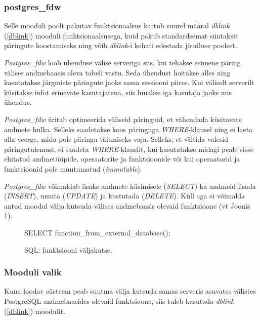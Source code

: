 \documentclass[a4paper,12pt]{article} %
\begin{document}
\subsubsection{postgres\_fdw}
Selle mooduli poolt pakutav funktsionaalsus kattub suurel määral \textit{dblink} (\ref{dblink}) mooduli funktsionaalsusega, kuid pakub standardsemat süntaksit päringute koostamiseks ning võib \textit{dblink}-i kohati edestada jõudluse poolest.\par
\textit{Postgres\_fdw} loob ühenduse välise serveriga siis, kui tehakse esimene päring välises andmebaasis oleva tabeli vastu. Seda ühendust hoitakse alles ning kasutatakse järgmiste päringute jaoks sama sessiooni piires. Kui väliselt serverilt küsitakse infot erinevate kasutajatena, siis luuakse iga kasutaja jaoks uus ühendus.\par
\textit{Postgres\_fdw} üritab optimeerida väliseid päringuid, et vähendada küsitavate andmete hulka. Selleks saadetakse koos päringuga \textit{WHERE}-klausel ning ei laeta alla veerge, mida pole päringu täitmiseks vaja. Selleks, et vältida valesid päringutulemusi, ei saadeta \textit{WHERE}-klauslit, kui kasutatakse midagi peale sisse ehitatud andmetüüpide, operaatorite ja funktsioonide või kui operaatorid ja funktsioonid pole muutumatud (\textit{immutable}). \cite{PostgreSQLfdw}\par
\textit{Postgres\_fdw} võimaldab lisaks andmete küsimisele (\textit{SELECT}) ka andmeid lisada (\textit{INSERT}), muuta (\textit{UPDATE}) ja kustutada (\textit{DELETE}). Küll aga ei võimalda antud moodul välja kutsuda välises andmebaasis olevaid funktsioone (vt Joonis \ref{fig_sql_funktsiooni_väljakutse}).
\begin{figure}[H]
\centering
\begin{SQL}
SELECT function_from_external_database();
\end{SQL}
\caption{SQL: funktsiooni väljakutse.}
\label{fig_sql_funktsiooni_väljakutse}
\end{figure}

\subsubsection{Mooduli valik}
Kuna loodav süsteem peab suutma välja kutsuda samas serveris asuvates välistes PostgreSQL andmebaasides olevaid funktsioone, siis tuleb kasutada \textit{dblink} (\ref{dblink}) moodulit.
\end{document}
